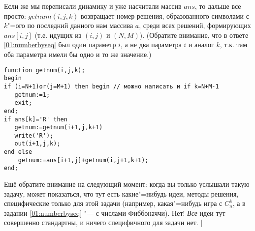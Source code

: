 Если же мы переписали динамику и уже насчитали массив $ans$, то дальше все просто:
$getnum(i,j,k)$ возвращает номер решения, образованного символами с $k$"=ого по последний данного нам 
массива $a$, среди всех решений, формирующих $ans[i,j]$ (т.е. идущих из $(i,j)$ и $(N,M)$). 
(Обратите внимание, что в ответе \ref{01:numberbyseq} был один параметр $i$, а не два параметра $i$ 
и аналог $k$, т.к. там оба параметра имели бы одно и то же значение.)
\begin{codesampleo}\begin{verbatim}
function getnum(i,j,k); 
begin
if (i=N+1)or(j=M+1) then begin // можно написать и if k=N+M-1
   getnum:=1;
   exit;
end;
if ans[k]='R' then 
   getnum:=getnum(i+1,j,k+1)
   write('R');
   out(i+1,j,k);
end else 
    getnum:=ans[i+1,j]+getnum(i,j+1,k+1);
end;
\end{verbatim}
\end{codesampleo}
Ещё обратите внимание на следующий момент: когда вы только услышали такую задачу, может показаться, 
что тут есть какие"=нибудь идеи, методы решения, специфические только для этой задачи (например, 
какая"=нибудь игра с $C_n^k$, а в задании \ref{01:numberbyseq} "--- с числами Фиббоначчи). Нет!
\textit{Все} идеи тут совершенно стандартны, и ничего специфичного для задачи нет.
|\label{tortoise:numberbypath}
